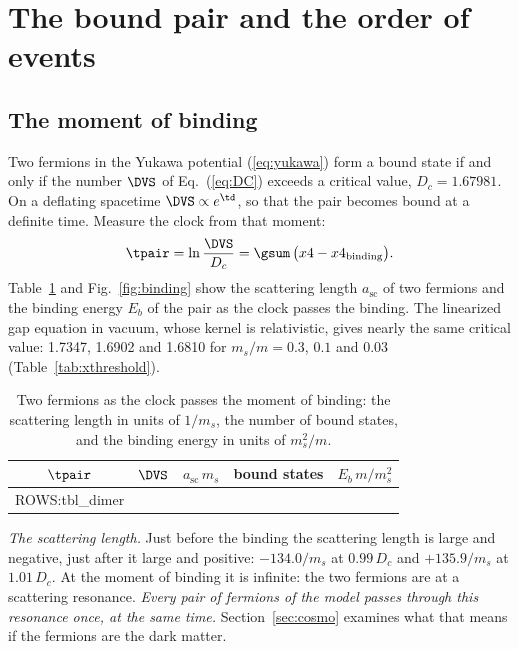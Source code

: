 \section{The bound pair and the order of events}
\label{sec:pair}

\subsection{The moment of binding}

Two fermions in the Yukawa potential (\ref{eq:yukawa}) form a bound state if and only if the number
$\DVS$ of Eq.~(\ref{eq:DC}) exceeds a critical value, $D_c=1.67981$. On a deflating spacetime
$\DVS\propto e^{\td}$, so that the pair becomes bound at a definite time. Measure the clock from that
moment:
\begin{equation}
\tpair=\ln\frac{\DVS}{D_c}=\gsum\,\big(x4-x4_{\mathrm{binding}}\big).
\label{eq:tpair}
\end{equation}
Table~\ref{tab:dimer} and Fig.~\ref{fig:binding} show the scattering length $a_{\mathrm{sc}}$ of two
fermions and the binding energy $E_b$ of the pair as the clock passes the binding. The linearized
gap equation in vacuum, whose kernel is relativistic, gives nearly the same critical value: 1.7347,
1.6902 and 1.6810 for $m_s/m=0.3$, $0.1$ and $0.03$ (Table~\ref{tab:xthreshold}).

\begin{table}
\caption{\label{tab:dimer}Two fermions as the clock passes the moment of binding: the scattering
length in units of $1/m_s$, the number of bound states, and the binding energy in units of
$m_s^{2}/m$.}
\begin{ruledtabular}
\begin{tabular}{ccccc}
$\tpair$ & $\DVS$ & $a_{\mathrm{sc}}\,m_s$ & bound states & $E_b\,m/m_s^{2}$ \\
\hline
{{ROWS:tbl_dimer}}
\end{tabular}
\end{ruledtabular}
\end{table}

\emph{The scattering length.} Just before the binding the scattering length is large and negative,
just after it large and positive: $-134.0/m_s$ at $0.99\,D_c$ and $+135.9/m_s$ at $1.01\,D_c$. At the
moment of binding it is infinite: the two fermions are at a scattering resonance. \emph{Every pair
of fermions of the model passes through this resonance once, at the same time.}
Section~\ref{sec:cosmo} examines what that means if the fermions are the dark matter.

